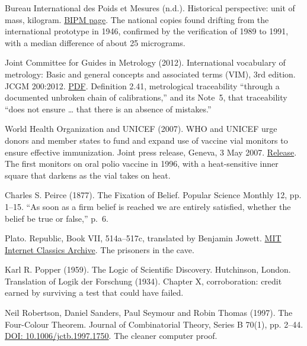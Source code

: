 \documentclass[11pt,twoside]{article}
\theoremstyle{thielethm}
\theoremstyle{thieledef}
\theoremstyle{thieledef}
\theoremstyle{thieledef}
\theoremstyle{thielethm}
\theoremstyle{thieleobs}
\theoremstyle{thielethm}
\begin{document}
\noindent Bureau International des Poids et Mesures (n.d.). Historical perspective: unit of mass, kilogram. \href{https://www.bipm.org/en/history-si/kilogram}{BIPM page}. The national copies found drifting from the international prototype in 1946, confirmed by the verification of 1989 to 1991, with a median difference of about 25 micrograms.
\par\medskip

\noindent Joint Committee for Guides in Metrology (2012). International vocabulary of metrology: Basic and general concepts and associated terms (VIM), 3rd edition. JCGM 200:2012. \href{https://www.bipm.org/documents/20126/2071204/JCGM_200_2012.pdf}{PDF}. Definition 2.41, metrological traceability ``through a documented unbroken chain of calibrations,'' and its Note~5, that traceability ``does not ensure \ldots{} that there is an absence of mistakes.''
\par\medskip

\noindent World Health Organization and UNICEF (2007). WHO and UNICEF urge donors and member states to fund and expand use of vaccine vial monitors to ensure effective immunization. Joint press release, Geneva, 3 May 2007. \href{https://www.gavi.org/news/media-room/who-and-unicef-urge-donors-and-member-states-fund-and-expand-use-vaccine-vial}{Release}. The first monitors on oral polio vaccine in 1996, with a heat-sensitive inner square that darkens as the vial takes on heat.
\par\medskip

\noindent Charles S. Peirce (1877). The Fixation of Belief. Popular Science Monthly 12, pp. 1--15. ``As soon as a firm belief is reached we are entirely satisfied, whether the belief be true or false,'' p.~6.
\par\medskip

\noindent Plato. Republic, Book VII, 514a--517c, translated by Benjamin Jowett. \href{https://classics.mit.edu/Plato/republic.8.vii.html}{MIT Internet Classics Archive}. The prisoners in the cave.
\par\medskip

\noindent Karl R. Popper (1959). The Logic of Scientific Discovery. Hutchinson, London. Translation of Logik der Forschung (1934). Chapter X, corroboration: credit earned by surviving a test that could have failed.
\par\medskip

\noindent Neil Robertson, Daniel Sanders, Paul Seymour and Robin Thomas (1997). The Four-Colour Theorem. Journal of Combinatorial Theory, Series B 70(1), pp. 2--44. \href{https://doi.org/10.1006/jctb.1997.1750}{DOI: 10.1006/jctb.1997.1750}. The cleaner computer proof.
\par\medskip
\end{document}
